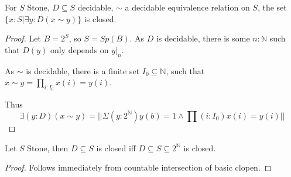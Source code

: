\begin{lemma}
  For $S$ Stone, $D\subseteq S$ decidable, 
  $\sim$ a decidable equivalence relation on $S$,
  the set $\{x:S | \exists y : D (x\sim y)\}$ is closed. 
\end{lemma}
\begin{proof}
  Let $B = 2^S$, so $S = Sp(B)$. 
  As $D$ is decidable, 
  there is some $n:\mathbb N$ such that $D(y)$ only depends on $y|_n$. 

  As $\sim$ is decidable, there is a finite set $I_0\subseteq \mathbb N$,
  such that $x\sim y = \prod_{i:I_0} x(i) = y(i)$. 

  Thus 
  $$
   \exists (y : D) (x\sim y) = 
  || \Sigma(y:2^\mathbb N) y(b) = 1 \wedge \prod(i:I_0) x(i) = y(i)||
  $$
\end{proof}



\begin{lemma}
  Let $S$ Stone, then $D\subseteq S$ is closed iff 
  $D\subseteq S\subseteq 2^{\mathbb N}$ is closed. 
\end{lemma}
\begin{proof}
  Follows immediately from countable intersection of basic clopen. 
\end{proof}




